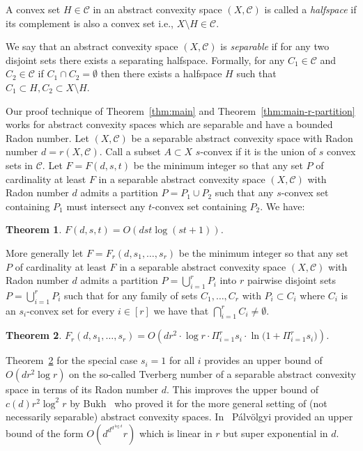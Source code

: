 \documentclass[11pt]{article}
\theoremstyle{plain}
\newtheorem{theorem}{Theorem}[section]
\theoremstyle{definition}
\theoremstyle{remark}
\newcommand{\calC}{\mathcal{C}}
\begin{document}
A convex set $H \in \calC$ in an abstract convexity space $(X,\calC)$ is called a {\em halfspace} if its complement is also a convex set i.e.,  $X\setminus H \in \calC$.

We say that an abstract convexity space $(X,\calC)$ is {\em separable} if for any two disjoint sets there exists a separating halfspace. Formally, for any $C_1 \in \calC $ and $C_2 \in \calC$  if $C_1 \cap C_2 = \emptyset $ then there exists a halfspace $H$ such that $C_1 \subset H, C_2 \subset  X \setminus H$. 

Our proof technique of Theorem~\ref{thm:main} and Theorem~\ref{thm:main-r-partition} works for abstract convexity spaces which are separable and have a bounded Radon number. Let $(X,\calC)$ be a separable abstract convexity space with Radon number $d=r(X,\calC)$.
Call a subset $A \subset X$ $s$-convex if it is the union of $s$ convex sets in $\calC$.
Let $F=F(d,s,t)$ be the minimum integer so that any set $P$ of cardinality at least $F$ in a separable abstract convexity space $(X, \calC)$ with Radon number $d$ admits
a partition $P = P_1 \cup P_2$ such that any $s$-convex set containing $P_1$ must intersect any $t$-convex set containing $P_2$. We have:

\begin{theorem}\label{thm:main-abstractspaces}
     $F(d,s,t)=O(d st \log {(st+1)})$.
 \end{theorem}

More generally let $F=F_r(d,s_1,\ldots,s_r)$ be the minimum integer so that any set $P$ of cardinality at least $F$ in a separable abstract convexity space $(X, \calC)$ with Radon number $d$ admits
a partition $P = \bigcup_{i=1}^r P_i$
into $r$ pairwise disjoint sets $P = \bigcup_{i=1}^r P_i$ such that for
    any family of sets $C_1,\ldots,C_r$ with $P_i \subset C_i$ where
    $C_i$ is an $s_i$-convex set for every $i \in [r]$ we have that
    $\bigcap_{i=1}^r C_i \neq \emptyset$.

\begin{theorem}\label{thm:main-abstractspaces-tverberg}
     $F_r(d,s_1,\ldots,s_r)=O\left (d r^2 \cdot \log r \cdot \Pi_{i=1}^r s_i 
\cdot {\ln (1+\Pi_{i=1}^r s_i}) \right )$.
 \end{theorem}
 
Theorem~\ref{thm:main-abstractspaces-tverberg} for the special case $s_i=1$ for all $i$ provides an upper bound of $O(d r^2 \log r)$ on the so-called Tverberg number of a separable abstract convexity space in terms of its Radon number $d$. This improves the upper bound of $c(d)r^2 \log ^2 r$ by Bukh~\cite{Bukh2010} who proved it for the more general setting of (not necessarily separable) abstract convexity spaces. 
In~\cite{palvolgyi-radon} P\'alv\"olgyi 
provided an upper bound of the form $O(d^{d^{d^{\log d}}}r)$ which is linear in $r$ but super exponential in $d$.
\end{document}
